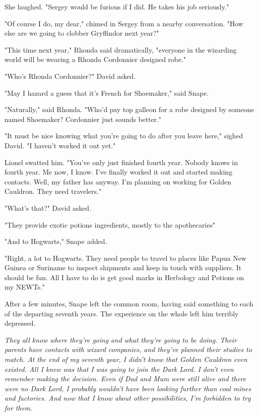 She laughed. "Sergey would be furious if I did. He takes his job seriously."

"Of course I do, my dear," chimed in Sergey from a nearby conversation. "How else are we going to clobber Gryffindor next year?"

"This time next year," Rhonda said dramatically, "everyone in the wizarding world will be wearing a Rhonda Cordonnier designed robe."

"Who's Rhonda Cordonnier?" David asked.

"May I hazard a guess that it's French for Shoemaker," said Snape.

"Naturally," said Rhonda. "Who'd pay top galleon for a robe designed by someone named Shoemaker? Cordonnier just sounds better."

"It must be nice knowing what you're going to do after you leave here," sighed David. "I haven't worked it out yet."

Lionel swatted him. "You've only just finished fourth year. Nobody knows in fourth year. Me now, I know. I've finally worked it out and started making contacts. Well, my father has anyway. I'm planning on working for Golden Cauldron. They need travelers."

"What's that?" David asked.

"They provide exotic potions ingredients, mostly to the apothecaries{\el}"

"And to Hogwarts," Snape added.

"Right, a lot to Hogwarts. They need people to travel to places like Papua New Guinea or Suriname to inspect shipments and keep in touch with suppliers. It should be fun. All I have to do is get good marks in Herbology and Potions on my NEWTs."

After a few minutes, Snape left the common room, having said something to each of the departing seventh years. The experience on the whole left him terribly depressed.

\emph{They all know where they're going and what they're going to be doing. Their parents have contacts with wizard companies, and they've planned their studies to match. At the end of my seventh year, I didn't know that Golden Cauldron even existed. All I knew was that I was going to join the Dark Lord. I don't even remember making the decision. Even if Dad and Mum were still alive and there were no Dark Lord, I probably wouldn't have been looking further than coal mines and factories. And now that I know about other possibilities, I'm forbidden to try for them.}

